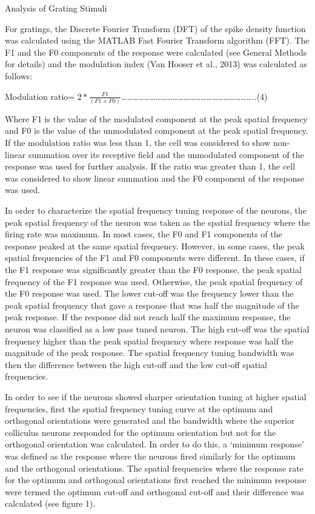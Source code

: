 {Analysis of Grating Stimuli}

For gratings, the Discrete Fourier Transform (DFT) of the spike density
function was calculated using the MATLAB Fast Fourier Transform
algorithm (FFT). The F1 and the F0 components of the response were
calculated (see General Methods for details) and the modulation index
(Van Hooser et al., 2013) was calculated as follows:

Modulation ratio=
\(2*\frac{F1}{(F1 + F0)}\)\ldots{}\ldots{}\ldots{}\ldots{}\ldots{}\ldots{}\ldots{}\ldots{}\ldots{}\ldots{}\ldots{}\ldots{}\ldots{}\ldots{}\ldots{}\ldots{}\ldots{}\ldots{}\ldots{}\ldots{}\ldots{}\ldots{}\ldots{}..(4)

Where F1 is the value of the modulated component at the peak spatial
frequency and F0 is the value of the unmodulated component at the peak
spatial frequency. If the modulation ratio was less than 1, the cell was
considered to show non-linear summation over its receptive field and the
unmodulated component of the response was used for further analysis. If
the ratio was greater than 1, the cell was considered to show linear
summation and the F0 component of the response was used.

In order to characterize the spatial frequency tuning response of the
neurons, the peak spatial frequency of the neuron was taken as the
spatial frequency where the firing rate was maximum. In most cases, the
F0 and F1 components of the response peaked at the same spatial
frequency. However, in some cases, the peak spatial frequencies of the
F1 and F0 components were different. In these cases, if the F1 response
was significantly greater than the F0 response, the peak spatial
frequency of the F1 response was used. Otherwise, the peak spatial
frequency of the F0 response was used. The lower cut-off was the
frequency lower than the peak spatial frequency that gave a response
that was half the magnitude of the peak response. If the response did
not reach half the maximum response, the neuron was classified as a low
pass tuned neuron. The high cut-off was the spatial frequency higher
than the peak spatial frequency where response was half the magnitude of
the peak response. The spatial frequency tuning bandwidth was then the
difference between the high cut-off and the low cut-off spatial
frequencies.

In order to see if the neurons showed sharper orientation tuning at
higher spatial frequencies, first the spatial frequency tuning curve at
the optimum and orthogonal orientations were generated and the bandwidth
where the superior colliculus neurons responded for the optimum
orientation but not for the orthogonal orientation was calculated. In
order to do this, a `minimum response' was defined as the response where
the neurons fired similarly for the optimum and the orthogonal
orientations. The spatial frequencies where the response rate for the
optimum and orthogonal orientations first reached the minimum response
were termed the optimum cut-off and orthogonal cut-off and their
difference was calculated (see figure 1).

